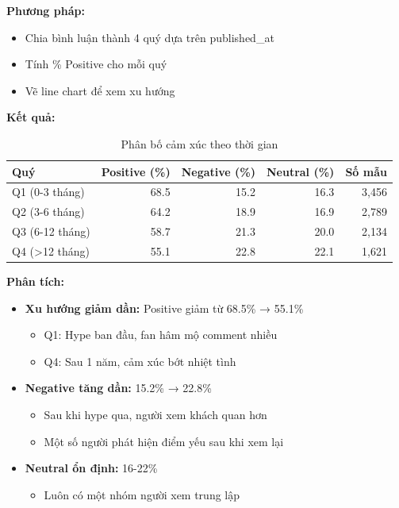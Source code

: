 \textbf{Phương pháp:}
\begin{itemize}
    \item Chia bình luận thành 4 quý dựa trên published\_at
    \item Tính \% Positive cho mỗi quý
    \item Vẽ line chart để xem xu hướng
\end{itemize}

\textbf{Kết quả:}
\begin{table}[H]
\centering
\caption{Phân bố cảm xúc theo thời gian}
\begin{tabular}{|l|r|r|r|r|}
\hline
\textbf{Quý} & \textbf{Positive (\%)} & \textbf{Negative (\%)} & \textbf{Neutral (\%)} & \textbf{Số mẫu} \\
\hline
Q1 (0-3 tháng) & 68.5 & 15.2 & 16.3 & 3,456 \\
\hline
Q2 (3-6 tháng) & 64.2 & 18.9 & 16.9 & 2,789 \\
\hline
Q3 (6-12 tháng) & 58.7 & 21.3 & 20.0 & 2,134 \\
\hline
Q4 (>12 tháng) & 55.1 & 22.8 & 22.1 & 1,621 \\
\hline
\end{tabular}
\end{table}

\textbf{Phân tích:}
\begin{itemize}
    \item \textbf{Xu hướng giảm dần:} Positive giảm từ 68.5\% → 55.1\%
    \begin{itemize}
        \item Q1: Hype ban đầu, fan hâm mộ comment nhiều
        \item Q4: Sau 1 năm, cảm xúc bớt nhiệt tình
    \end{itemize}
    
    \item \textbf{Negative tăng dần:} 15.2\% → 22.8\%
    \begin{itemize}
        \item Sau khi hype qua, người xem khách quan hơn
        \item Một số người phát hiện điểm yếu sau khi xem lại
    \end{itemize}
    
    \item \textbf{Neutral ổn định:} 16-22\%
    \begin{itemize}
        \item Luôn có một nhóm người xem trung lập
    \end{itemize}
\end{itemize}

